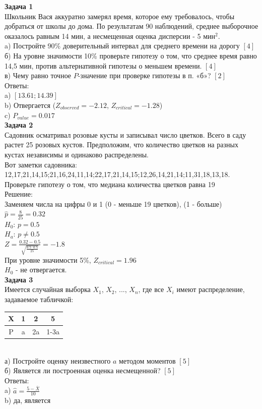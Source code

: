 \documentclass[12pt, a4paper]{article}\usepackage[]{graphicx}\usepackage[]{color}
\begin{document}
	\textbf{Задача 1} \\
	Школьник Вася аккуратно замерял время, которое ему требовалось, чтобы добраться от школы до дома. По результатам 90 наблюдений, среднее выборочное оказалось равным 14 мин, а несмещенная оценка дисперсии - 5 мин$^{2}$. \\
	a) Постройте 90\% доверительный интервал для среднего времени на дорогу $[4]$ \\
	б) На уровне значимости 10\% проверьте гипотезу о том, что среднее время равно 14,5 мин, против альтернативной гипотезы о меньшем времени. $[4]$ \\
	в) Чему равно точное $P$-значение при проверке гипотезы в п. «б»? $[2]$ \\
	Ответы: \\
	a) $[13.61;14.39]$ \\
	b) Отвергается ($Z_{observed}=-2.12$, $Z_{critical}=-1.28$) \\
	c) $P_{value}=0.017$ \\



	\textbf{Задача 2} \\ %
	Садовник осматривал розовые кусты и записывал число цветков. Всего в саду растет 25 розовых кустов. Предположим, что количество цветков на разных кустах независимы и одинаково распределены. \\
	Вот заметки садовника: \\
	12,17,21,14,15;21,16,24,11,14;22,17,21,14,15;12,26,14,21,14;11,31,18,13,18.\\
	Проверьте гипотезу о том, что медиана количества цветков равна 19\\
	Решение: \\
	Заменяем числа на цифры 0 и 1 (0 - меньше 19 цветков), (1 - больше) \\
	$\hat{p}=\frac{8}{25}=0.32$ \\
	$H_{0}$: $p=0.5$ \\
	$H_{a}$: $p\neq 0.5$ \\
	$Z=\frac{0.32-0.5}{\sqrt{\frac{0.5\cdot 0.5}{25}}}=-1.8$ \\
	При уровне значимости 5\%, $Z_{critical}=1.96$ \\
	$H_{0}$ - не отвергается. \\

	\textbf{Задача 3} \\ %
	Имеется случайная выборка $X_{1}$, $X_{2}$, ..., $X_{n}$, где все $X_{i}$ имеют распределение, задаваемое табличкой: \\
	\begin{tabular}{|c|c|c|c|}
		\hline
		X & 1 & 2 & 5 \\
		\hline
		P & a & 2a & 1-3a \\
		\hline
	\end{tabular} \\
	а) Постройте оценку неизвестного $a$ методом моментов $[5]$ \\
	б) Является ли построенная оценка несмещенной? $[5]$ \\
	Ответы: \\
	a) $\hat{a}=\frac{5-\bar{X}}{10}$ \\
	b) да, является \\
\end{document}

